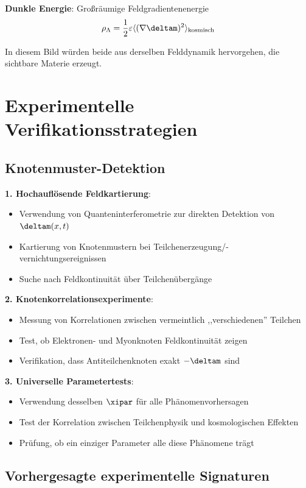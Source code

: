 	\textbf{Dunkle Energie}: Großräumige Feldgradientenenergie
	\begin{equation}
		\rho_{\Lambda} = \frac{1}{2} \varepsilon \langle (\nabla \deltam)^2 \rangle_{\text{kosmisch}}
	\end{equation}
	
	In diesem Bild würden beide aus derselben Felddynamik hervorgehen, die sichtbare Materie erzeugt.
	
	\section{Experimentelle Verifikationsstrategien}
	
	\subsection{Knotenmuster-Detektion}
	
	\textbf{1. Hochauflösende Feldkartierung}:
	\begin{itemize}
		\item Verwendung von Quanteninterferometrie zur direkten Detektion von $\deltam(x,t)$
		\item Kartierung von Knotenmustern bei Teilchenerzeugung/-vernichtungsereignissen
		\item Suche nach Feldkontinuität über Teilchenübergänge
	\end{itemize}
	
	\textbf{2. Knotenkorrelationsexperimente}:
	\begin{itemize}
		\item Messung von Korrelationen zwischen vermeintlich ,,verschiedenen'' Teilchen
		\item Test, ob Elektronen- und Myonknoten Feldkontinuität zeigen
		\item Verifikation, dass Antiteilchenknoten exakt $-\deltam$ sind
	\end{itemize}
	
	\textbf{3. Universelle Parametertests}:
	\begin{itemize}
		\item Verwendung desselben $\xipar$ für alle Phänomenvorhersagen
		\item Test der Korrelation zwischen Teilchenphysik und kosmologischen Effekten
		\item Prüfung, ob ein einziger Parameter alle diese Phänomene trägt
	\end{itemize}
	
	\subsection{Vorhergesagte experimentelle Signaturen}
	
